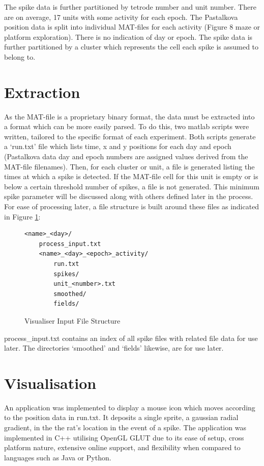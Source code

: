 \documentclass[11pt]{report}
\begin{document}
The spike data is further partitioned by tetrode number and unit number. There are on average, 17 units with some activity for each epoch. The Pastalkova position data is split into individual MAT-files for each activity (Figure 8 maze or platform exploration). There is no indication of day or epoch. The spike data is further partitioned by a cluster which represents the cell each spike is assumed to belong to.

\section{Extraction}
As the MAT-file is a proprietary binary format, the data must be extracted into a format which can be more easily parsed. To do this, two matlab scripts were written, tailored to the specific format of each experiment. Both scripts generate a `run.txt' file which lists time, x and y positions for each day and epoch (Pastalkova data day and epoch numbers are assigned values derived from the MAT-file filenames). Then, for each cluster or unit, a file is generated listing the times at which a spike is detected. If the MAT-file cell for this unit is empty or is below a certain threshold number of spikes, a file is not generated. This minimum spike parameter will be discussed along with others defined later in the process.\\
For ease of processing later, a file structure is built around these files as indicated in Figure \ref{fig:a}:

\begin{figure}[h!]
\begin{lstlisting}
<name>_<day>/
    process_input.txt
    <name>_<day>_<epoch>_activity/
        run.txt
        spikes/
        unit_<number>.txt
        smoothed/
        fields/
\end{lstlisting}
\caption{Visualiser Input File Structure}
\label{fig:a}
\end{figure}

process\_input.txt contains an index of all spike files with related file data for use later. The directories `smoothed' and `fields' likewise, are for use later.\\

\section{Visualisation}
An application was implemented to display a mouse icon which moves according to the position data in run.txt. It deposits a single sprite, a gaussian radial gradient, in the the rat's location in the event of a spike. The application was implemented in C++ utilising OpenGL GLUT due to its ease of setup, cross platform nature, extensive online support, and flexibility when compared to languages such as Java or Python.
\end{document}
